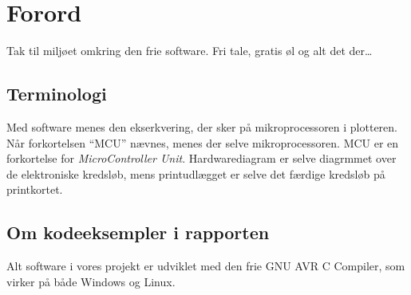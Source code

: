 \chapter{Forord}



Tak til miljøet omkring den frie software. Fri tale, gratis øl og alt
det der\dots {}

\section{Terminologi}


Med software menes den ekserkvering, der sker på mikroprocessoren i
plotteren. Når forkortelsen \enquote{MCU} nævnes, menes der selve
mikroprocessoren. MCU er en forkortelse for \textit{MicroController
  Unit}. Hardwarediagram er selve diagrmmet over de elektroniske
kredsløb, mens printudlægget er selve det færdige kredsløb på
printkortet.

\section{Om kodeeksempler i rapporten}

Alt software i vores projekt er udviklet med den frie GNU AVR C
Compiler, som virker på både Windows og Linux.


